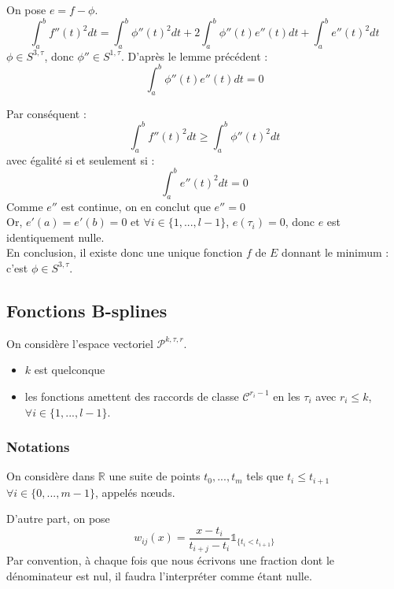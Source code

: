 
\begin{dem}
On pose $e=f-\phi$.
\[\int_a^b f''(t)^2dt = \int_a^b \phi''(t)^2 dt + 2\int_a^b \phi''(t)e''(t) dt + \int_a^b e''(t)^2 dt\]
$\phi \in S^{3,\tau}$, donc $\phi''\in S^{1,\tau}$. D'après le lemme précédent :
\[\int_a^b \phi''(t) e''(t) dt = 0\]

Par conséquent :
	\[\int_a^b f''(t)^2 dt \geq \int_a^b \phi''(t)^2 dt\]
avec égalité si et seulement si :
\[\int_a^b e''(t)^2 dt = 0\]
Comme $e''$ est continue, on en conclut que $e''=0$\\
Or, $e'(a)=e'(b)=0$ et $\forall i\in \{1,...,l-1\}$, $e(\tau_i)=0$, donc $e$ est identiquement nulle.\\
En conclusion, il existe donc une unique fonction $f$ de $E$ donnant le minimum : c'est $\phi \in S^{3,\tau}$.
\end{dem}

\subsection{Fonctions B-splines}

On considère l'espace vectoriel $\mathcal{P}^{k,\tau,r}$.
\begin{itemize}
	\item $k$ est quelconque
	\item les fonctions amettent des raccords de classe $\mathcal{C}^{r_i-1}$ en les $\tau_i$ avec $r_i\leq k$, $\forall i\in \{1,...,l-1\}$.
\end{itemize}

\subsubsection{Notations}
On considère dans $\mathbb{R}$ une suite de points $t_0,...,t_m$ tels que $t_i\leq t_{i+1}$ $\forall i\in\{0,...,m-1\}$, appelés n\oe uds.


D'autre part, on pose \[w_{ij}(x)=\frac{x-t_i}{t_{i+j}-t_i} \mathds{1}_{\{t_i<t_{i+1}\}}\]
Par convention, à chaque fois que nous écrivons une fraction dont le dénominateur est nul, il faudra l'interpréter comme étant nulle.

